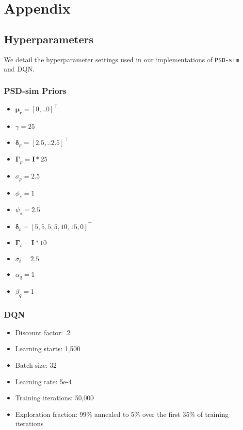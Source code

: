 \appendix
\section{Appendix}

\subsection{Hyperparameters}
We detail the hyperparameter settings used in our implementations of \texttt{PSD-sim} and DQN.

\subsubsection{PSD-sim Priors}

\begin{itemize}
  

        \item $\boldsymbol{\mu_r}= [0, .. 0]^{\top}$
        \item $\gamma = 25$




    
        \item $\boldsymbol{\delta}_p= [2.5 , .. 2.5 ]^{\top}$
        \item $\boldsymbol{\Gamma}_p = \textbf{I}* 25$
  
        \item $\sigma_p = 2.5$



        \item $\phi_s = 1$
        \item $\psi_s = 2.5 $



        \item $\boldsymbol{\delta}_t = [5, 5, 5, 5, 10, 15, 0]^\top$
        \item $\boldsymbol{\Gamma}_t = \textbf{I}* 10$
        \item $\sigma_t = 2.5$



        \item $\alpha_q = 1$
        \item $\beta_q = 1$

 
    
\end{itemize}



\subsubsection{DQN}

\begin{itemize}
    \item Discount factor: .2
    \item Learning starts: 1,500
    \item Batch size: 32
    \item Learning rate: 5e-4
    \item Training iterations: 50,000
    \item Exploration fraction: 99\% annealed to 5\% over the first 35\% of training iterations
    
    
\end{itemize}